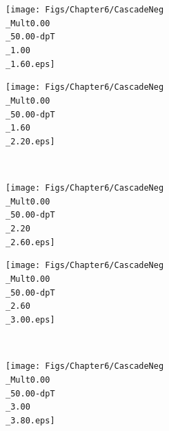 \begin{figure}[!p]
	\begin{minipage}[t]{.5\textwidth}
        \hspace*{-1.5cm}
        \texttt{[image: Figs/Chapter6/CascadeNeg\\\_Mult0.00\\\_50.00-dpT\\\_1.00\\\_1.60.eps]}
    \end{minipage}
    \hfill
    \begin{minipage}[t]{.5\textwidth}
        \hspace*{.5cm}
        \texttt{[image: Figs/Chapter6/CascadeNeg\\\_Mult0.00\\\_50.00-dpT\\\_1.60\\\_2.20.eps]}
    \end{minipage}\\
    \begin{minipage}[t]{.5\textwidth}
        \hspace*{-1.5cm}
        \texttt{[image: Figs/Chapter6/CascadeNeg\\\_Mult0.00\\\_50.00-dpT\\\_2.20\\\_2.60.eps]}
    \end{minipage}
    \hfill
    \begin{minipage}[t]{.5\textwidth}
        \hspace*{.5cm}
        \texttt{[image: Figs/Chapter6/CascadeNeg\\\_Mult0.00\\\_50.00-dpT\\\_2.60\\\_3.00.eps]}
    \end{minipage}\\
    \begin{minipage}[t]{.5\textwidth}
        \hspace*{-1.5cm}
        \texttt{[image: Figs/Chapter6/CascadeNeg\\\_Mult0.00\\\_50.00-dpT\\\_3.00\\\_3.80.eps]}
    \end{minipage}
    \hfill
    \begin{minipage}[t]{.5\textwidth}
        \hspace*{0.5cm}

\end{minipage}
\end{figure}
